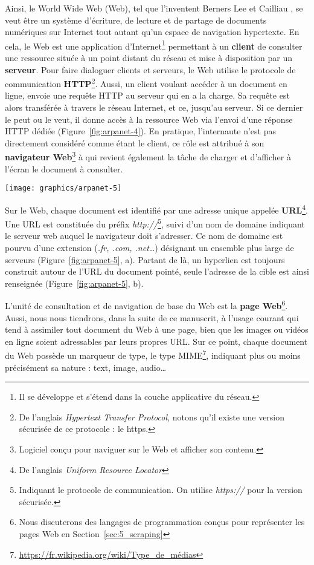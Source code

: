 \documentclass[symmetric,justified,marginals=raggedouter]{tufte-book}
\begin{document}
\noindent Ainsi, le World Wide Web (Web), tel que l'inventent Berners Lee et Cailliau \citep{cern_document_1993}, se veut être un système d'écriture, de lecture et de partage de documents numériques sur Internet tout autant qu'un espace de navigation hypertexte. En cela, le Web est une application d'Internet\footnote{\RaggedOuter Il se développe et s'étend dans la couche applicative du réseau.} permettant à un \textbf{client} de consulter une ressource située à un point distant du réseau et mise à disposition par un \textbf{serveur}. Pour faire dialoguer clients et serveurs, le Web utilise le protocole de communication \textbf{HTTP}\footnote{\RaggedOuter De l'anglais \textit{Hypertext Transfer Protocol}, notons qu'il existe une version sécurisée de ce protocole : le https.}. Aussi, un client voulant accéder à un document en ligne, envoie une requête HTTP au serveur qui en a la charge. Sa requête est alors transférée à travers le réseau Internet, et ce, jusqu'au serveur. Si ce dernier le peut ou le veut, il donne accès à la ressource Web via l'envoi d'une réponse HTTP dédiée (Figure~\ref{fig:arpanet-4}). En pratique, l'internaute n'est pas directement considéré comme étant le client, ce rôle est attribué à son \textbf{navigateur Web}\footnote{\RaggedOuter Logiciel conçu pour naviguer sur le Web et afficher son contenu.} à qui revient également la tâche de charger et d'afficher à l'écran le document à consulter. 

\begin{figure*}
  \texttt{[image: graphics/arpanet-5]}
  \caption{De la page au site Web}
  \label{fig:arpanet-5}
\end{figure*} 

\noindent Sur le Web, chaque document est identifié par une adresse unique appelée \textbf{URL}\footnote{\RaggedOuter De l'anglais \textit{Uniform Resource Locator}}. Une URL est constituée du préfix {\NoAutoSpacing \textit{http://}}\footnote{\RaggedOuter Indiquant le protocole de communication. On utilise {\NoAutoSpacing \textit{https://}} pour la version sécurisée.}, suivi d'un nom de domaine indiquant le serveur web auquel le navigateur doit s'adresser. Ce nom de domaine est pourvu d'une extension (\textit{.fr, .com, .net}\ldots{}) désignant un ensemble plus large de serveurs (Figure~\ref{fig:arpanet-5}, a). Partant de là, un hyperlien est toujours construit autour de l'URL du document pointé, seule l'adresse de la cible est ainsi renseignée (Figure~\ref{fig:arpanet-5}, b).  

L'unité de consultation et de navigation de base du Web est la \textbf{page Web}\footnote{\RaggedOuter Nous discuterons des langages de programmation conçus pour représenter les pages Web en Section~\ref{sec:5_scraping}}. Aussi, nous nous tiendrons, dans la suite de ce manuscrit, à l'usage courant qui tend à assimiler tout document du Web à une page, bien que les images ou vidéos en ligne soient adressables par leurs propres URL. Sur ce point, chaque document du Web possède un marqueur de type, le type MIME\footnote{\RaggedOuter \url{https://fr.wikipedia.org/wiki/Type\_de\_médias}}, indiquant plus ou moins précisément sa nature : text, image, audio\ldots{} 
\end{document}
